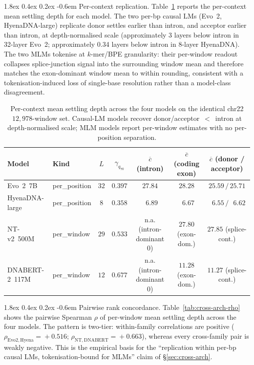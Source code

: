 \documentclass{article}
\makeatletter
\renewcommand\paragraph{\@startsection{paragraph}{4}{\z@}%
  {1.8ex \@plus 0.4ex \@minus 0.2ex}%
  {-0.6em}%
{\normalfont\normalsize\bfseries}}
\theoremstyle{plain}
\theoremstyle{definition}
\theoremstyle{remark}
\makeatother
\begin{document}
\paragraph{Per-context replication.} Table~\ref{tab:cross-arch-context}
reports the per-context mean settling depth for each model. The two
per-bp causal LMs (Evo~2, HyenaDNA-large) replicate
donor settles earlier than intron, and acceptor earlier than intron, at depth-normalised scale
(approximately 3 layers below intron in 32-layer Evo~2; approximately 0.34 layers below intron in 8-layer HyenaDNA). The two MLMs tokenise at $k$-mer/BPE
granularity: their per-window readout collapses splice-junction signal
into the surrounding window mean and therefore matches the exon-dominant
window mean to within rounding, consistent with a tokenisation-induced
loss of single-base resolution rather than a model-class disagreement.

\begin{table}[!htbp]
  \caption{Per-context mean settling depth across the four models on the
    identical chr22 $12{,}978$-window set. Causal-LM models recover
    donor/acceptor~$<$~intron at depth-normalised scale; MLM models
  report per-window estimates with no per-position separation.}
  \label{tab:cross-arch-context}
  \centering
  \footnotesize
  \setlength{\tabcolsep}{4pt}
  \begin{tabular}{@{}llccccc@{}}
    \toprule
    Model & Kind & $L$ & $\gamma_{q_{70}}$
    & $\overline{c}$ (intron) & $\overline{c}$ (coding exon)
    & $\overline{c}$ (donor / acceptor) \\
    \midrule
    Evo~2~7B            & per\_position & $32$ & $0.397$
    & $27.84$ & $28.28$ & $25.59 \,/\, 25.71$ \\
    HyenaDNA-large      & per\_position & $8$  & $0.358$
    & $\phantom{0}6.89$ & $\phantom{0}6.67$
    & $\phantom{0}6.55 \,/\, \phantom{0}6.62$ \\
    NT-v2~500M          & per\_window   & $29$ & $0.533$
    & n.a. (intron-dominant 0)
    & $27.80$ (exon-dom.) & $27.85$ (splice-cont.) \\
    DNABERT-2~117M      & per\_window   & $12$ & $0.677$
    & n.a. (intron-dominant 0)
    & $11.28$ (exon-dom.) & $11.27$ (splice-cont.) \\
    \bottomrule
  \end{tabular}
\end{table}

\paragraph{Pairwise rank concordance.} Table~\ref{tab:cross-arch-rho}
shows the pairwise Spearman $\rho$ of per-window mean settling depth
across the four models. The pattern is two-tier: within-family
correlations are positive ($\rho_{\mathrm{Evo2,Hyena}}\!=\!+0.516$;
$\rho_{\mathrm{NT,DNABERT}}\!=\!+0.663$), whereas every cross-family
pair is weakly negative. This is the empirical basis for the
``replication within per-bp causal LMs, tokenisation-bound for MLMs''
claim of \S\ref{sec:cross-arch}.
\end{document}
